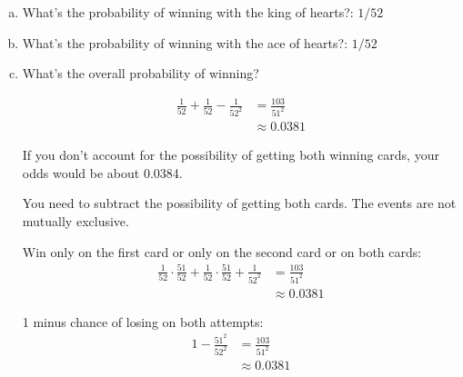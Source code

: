 \documentclass[letterpaper, landscape]{exam}
\begin{document}
  
  \begin{enumerate}[(a)]
    \item What's the probability of winning with the king of hearts?: $1/52$
    \item What's the probability of winning with the ace of hearts?: $1/52$

    \item What's the overall probability of winning? 
    
    \begin{solution}
      \begin{align*}
        \frac{1}{52} + \frac{1}{52} - \frac{1}{52^2} & = \frac{103}{51^2} \\
                                                     & \approx 0.0381
      \end{align*}
      
      If you don't account for the possibility of getting both winning cards,
      your odds would be about 0.0384.
      
      You need to subtract the possibility of getting both cards. The events are
      not mutually exclusive.

      Win only on the first card or only on the second card or on both cards:
      \begin{align*}
        \frac{1}{52} \cdot \frac{51}{52} + \frac{1}{52} \cdot \frac{51}{52} 
            + \frac{1}{52^2} & = \frac{103}{51^2} \\
                             & \approx 0.0381
      \end{align*}

      1 minus chance of losing on both attempts:
      \begin{align*}
            1 - \frac{51^2}{52^2} & = \frac{103}{51^2} \\
                                  & \approx 0.0381
      \end{align*}

    \end{solution}
  \end{enumerate}





\end{document}
